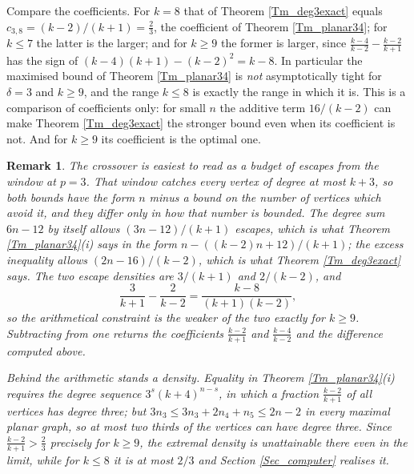\documentclass[12pt,a4paper]{article}%
\newtheorem{remark}[theorem]{Remark}
\begin{document}


Compare the coefficients. For $k=8$ that of Theorem \ref{Tm_deg3exact} equals $c_{3,8}=(k-2)/(k+1)=\frac23$, the
coefficient of Theorem \ref{Tm_planar34}; for $k\leq 7$ the latter is the larger; and for $k\geq 9$ the former is
larger, since $\frac{k-4}{k-2}-\frac{k-2}{k+1}$ has the sign of $(k-4)(k+1)-(k-2)^{2}=k-8$. In particular the
maximised bound of Theorem \ref{Tm_planar34} is \emph{not} asymptotically tight for $\delta =3$ and $k\geq 9$,
and the range $k\leq 8$ is exactly the range in which it is. This is a comparison of coefficients only: for
small $n$ the additive term $16/(k-2)$ can make Theorem \ref{Tm_deg3exact} the stronger bound even when its
coefficient is not. And for $k\geq 9$ its coefficient is the optimal one.

\begin{remark}
\label{Rem_crossover}
The crossover is easiest to read as a budget of escapes from the window at $p=3$. That window
catches every vertex of degree at most $k+3$, so both bounds have the form $n$ minus a bound on the
number of vertices which avoid it, and they differ only in how that number is bounded. The degree
sum $6n-12$ by itself allows $(3n-12)/(k+1)$ escapes, which is what Theorem \ref{Tm_planar34}(i)
says in the form $n-((k-2)n+12)/(k+1)$; the excess inequality allows $(2n-16)/(k-2)$, which is what
Theorem \ref{Tm_deg3exact} says. The two escape densities are $3/(k+1)$ and $2/(k-2)$, and
\[
\frac{3}{k+1}-\frac{2}{k-2}=\frac{k-8}{(k+1)(k-2)},
\]
so the arithmetical constraint is the weaker of the two exactly for $k\geq 9$. Subtracting from one
returns the coefficients $\frac{k-2}{k+1}$ and $\frac{k-4}{k-2}$ and the difference computed above.

Behind the arithmetic stands a density. Equality in Theorem \ref{Tm_planar34}(i) requires the degree
sequence $3^{s}(k+4)^{n-s}$, in which a fraction $\frac{k-2}{k+1}$ of all vertices has degree three;
but $3n_{3}\leq 3n_{3}+2n_{4}+n_{5}\leq 2n-2$ in every maximal planar graph, so at most two thirds of the
vertices can have degree three. Since $\frac{k-2}{k+1}>\frac{2}{3}$ precisely for $k\geq 9$, the
extremal density is unattainable there even in the limit, while for $k\leq 8$ it is at most $2/3$
and Section \ref{Sec_computer} realises it. 
\end{remark}
\end{document}

